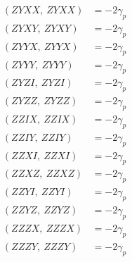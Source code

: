 \documentclass{article}
\begin{document}
\begin{align*}
  (ZYXX,\ ZYXX) &= - 2 \gamma_{p} \\
  (ZYXY,\ ZYXY) &= - 2 \gamma_{p} \\
  (ZYYX,\ ZYYX) &= - 2 \gamma_{p} \\
  (ZYYY,\ ZYYY) &= - 2 \gamma_{p} \\
  (ZYZI,\ ZYZI) &= - 2 \gamma_{p} \\
  (ZYZZ,\ ZYZZ) &= - 2 \gamma_{p} \\
  (ZZIX,\ ZZIX) &= - 2 \gamma_{p} \\
  (ZZIY,\ ZZIY) &= - 2 \gamma_{p} \\
  (ZZXI,\ ZZXI) &= - 2 \gamma_{p} \\
  (ZZXZ,\ ZZXZ) &= - 2 \gamma_{p} \\
  (ZZYI,\ ZZYI) &= - 2 \gamma_{p} \\
  (ZZYZ,\ ZZYZ) &= - 2 \gamma_{p} \\
  (ZZZX,\ ZZZX) &= - 2 \gamma_{p} \\
  (ZZZY,\ ZZZY) &= - 2 \gamma_{p}
\end{align*}
\end{document}
